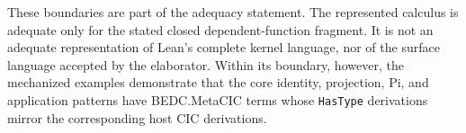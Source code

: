These boundaries are part of the adequacy statement. The represented calculus
is adequate only for the stated closed dependent-function fragment. It is not
an adequate representation of Lean's complete kernel language, nor of the
surface language accepted by the elaborator. Within its boundary, however, the
mechanized examples demonstrate that the core identity, projection, Pi, and
application patterns have BEDC.MetaCIC terms whose \texttt{HasType}
derivations mirror the corresponding host CIC derivations.
